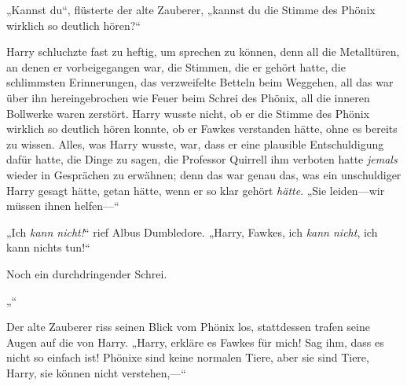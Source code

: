 „Kannst du“, flüsterte der alte Zauberer, „kannst du die Stimme des Phönix wirklich so deutlich hören?“

Harry schluchzte fast zu heftig, um sprechen zu können, denn all die Metalltüren, an denen er vorbeigegangen war, die Stimmen, die er gehört hatte, die schlimmsten Erinnerungen, das verzweifelte Betteln beim Weggehen, all das war über ihn hereingebrochen wie Feuer beim Schrei des Phönix, all die inneren Bollwerke waren zerstört. Harry wusste nicht, ob er die Stimme des Phönix wirklich so deutlich hören konnte, ob er Fawkes verstanden hätte, ohne es bereits zu wissen. Alles, was Harry wusste, war, dass er eine plausible Entschuldigung dafür hatte, die Dinge zu sagen, die Professor Quirrell ihm verboten hatte \emph{jemals} wieder in Gesprächen zu erwähnen; denn das war genau das, was ein unschuldiger Harry gesagt hätte, getan hätte, wenn er so klar gehört \emph{hätte}.
„Sie leiden—wir müssen ihnen helfen—“

„Ich \emph{kann nicht!}“ rief Albus Dumbledore.
„Harry, Fawkes, ich \emph{kann nicht}, ich kann nichts tun!“

Noch ein durchdringender Schrei.

„“

Der alte Zauberer riss seinen Blick vom Phönix los, stattdessen trafen seine Augen auf die von Harry.
„Harry, erkläre es Fawkes für mich! Sag ihm, dass es nicht so einfach ist! Phönixe sind keine normalen Tiere, aber sie sind Tiere, Harry, sie können nicht verstehen,—“

